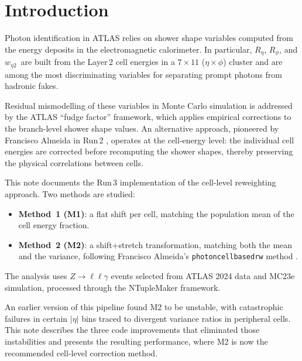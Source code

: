 \documentclass[11pt,a4paper]{article}
\newcommand{\Reta}{\ensuremath{R_{\eta}}}
\newcommand{\Rphi}{\ensuremath{R_{\phi}}}
\newcommand{\weta}{\ensuremath{w_{\eta 2}}}
\newcommand{\abseta}{\ensuremath{|\eta|}}
\begin{document}
\tableofcontents
\newpage


\section{Introduction}
\label{sec:intro}

Photon identification in ATLAS relies on shower shape variables computed
from the energy deposits in the electromagnetic calorimeter.  In
particular, \Reta, \Rphi, and \weta\ are built from the Layer\,2
cell energies in a $7 \times 11$ ($\eta \times \phi$) cluster and are
among the most discriminating variables for separating prompt photons
from hadronic fakes.

Residual mismodelling of these variables in Monte Carlo simulation is
addressed by the ATLAS ``fudge factor'' framework, which applies
empirical corrections to the branch-level shower shape values.  An
alternative approach, pioneered by Francisco Almeida in Run\,2
\cite{francisco}, operates at the cell-energy level: the individual cell
energies are corrected before recomputing the shower shapes, thereby
preserving the physical correlations between cells.

This note documents the Run\,3 implementation of the cell-level
reweighting approach.  Two methods are studied:
\begin{itemize}
  \item \textbf{Method~1 (M1)}: a flat shift per cell, matching the
        population mean of the cell energy fraction.
  \item \textbf{Method~2 (M2)}: a shift+stretch transformation, matching
        both the mean and the variance, following Francisco Almeida's
        \texttt{photoncellbasedrw} method \cite{francisco}.
\end{itemize}
The analysis uses $Z \to \ell\ell\gamma$ events selected from ATLAS 2024
data and MC23e simulation, processed through the NTupleMaker framework.

An earlier version of this pipeline found M2 to be unstable, with
catastrophic failures in certain $\abseta$ bins traced to divergent
variance ratios in peripheral cells.  This note describes the three code
improvements that eliminated those instabilities and presents the
resulting performance, where M2 is now the recommended cell-level
correction method.


\end{document}
